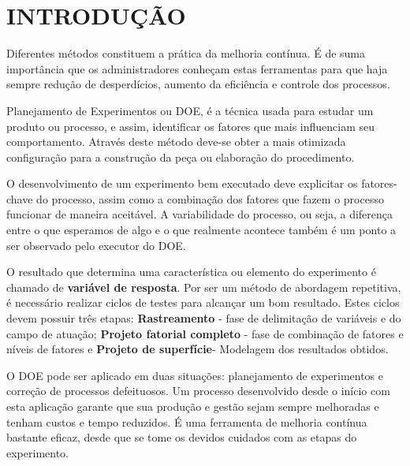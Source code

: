 \chapter{INTRODUÇÃO}
    Diferentes métodos constituem a prática da melhoria contínua. É de suma importância que os administradores conheçam estas ferramentas para que haja sempre redução de desperdícios, aumento da eficiência e controle dos processos.\cite{entenda_doe}

    Planejamento de Experimentos ou \ac{DOE}, é a técnica usada para estudar um produto ou processo, e assim, identificar os fatores que mais influenciam seu comportamento. Através deste método deve-se obter a mais otimizada configuração para a construção da peça ou elaboração do procedimento.\cite{oquee_doe}

    O desenvolvimento de um experimento bem executado deve explicitar os fatores-chave do processo, assim como a combinação dos fatores que fazem o processo funcionar de maneira aceitável. A variabilidade do processo, ou seja, a diferença entre o que esperamos de algo e o que realmente acontece também é um ponto a ser observado pelo executor do DOE.

    O resultado que determina uma característica ou elemento do experimento é chamado de \textbf{variável de resposta}. Por ser um método de abordagem repetitiva, é necessário realizar ciclos de testes para alcançar um bom resultado. Estes ciclos devem possuir três etapas: \textbf{Rastreamento} - fase de delimitação de variáveis e do campo de atuação; \textbf{Projeto fatorial completo} - fase de combinação de fatores e níveis de fatores e \textbf{Projeto de superfície}- Modelagem dos resultados obtidos.   

    O DOE pode ser aplicado em duas situações: planejamento de experimentos e correção de processos defeituosos. Um processo desenvolvido desde o início com esta aplicação garante que sua produção e gestão sejam sempre melhoradas e tenham custos e tempo reduzidos. É uma ferramenta de melhoria contínua bastante eficaz, desde que se tome os devidos cuidados com as etapas do experimento. \cite{oquee_doe}


    
    
    



